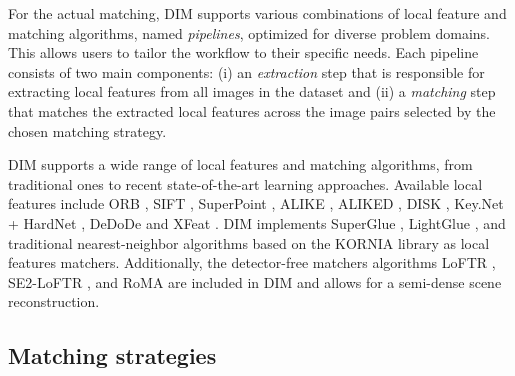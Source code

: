 For the actual matching, DIM supports various combinations of local feature and matching algorithms, named \textit{pipelines}, optimized for diverse problem domains. 
This allows users to tailor the workflow to their specific needs. 
Each pipeline consists of two main components: (i) an \textit{extraction} step that is responsible for extracting local features from all images in the dataset and (ii) a \textit{matching} step that matches the extracted local features across the image pairs selected by the chosen matching strategy.  

DIM supports a wide range of local features and matching algorithms, from traditional ones to recent state-of-the-art learning approaches. 
Available local features include ORB \citep{Rublee2011}, SIFT \citep{Lowe2004}, SuperPoint \citep{DeTone_2018}, ALIKE \citep{zhao2022alike}, ALIKED \citep{zhao2023aliked}, DISK \citep{tyszkiewicz2020disk}, Key.Net \citep{barrosolaguna2019keynet} + HardNet \citep{pultar2020improving}, DeDoDe \citep{edstedt2024dedode} and XFeat \cite{potje2024cvpr}.
DIM implements SuperGlue \citep{sarlin2020superglue}, LightGlue \citep{lindenberger2023lightglue}, and traditional nearest-neighbor algorithms based on the KORNIA library \citep{riba2019kornia} as local features matchers. 
Additionally, the detector-free matchers algorithms LoFTR \citep{sun2021_loftr}, SE2-LoFTR \citep{Bkman2022_se2loftr}, and RoMA \citep{edstedt2023roma} are included in DIM and allows for a semi-dense scene reconstruction.

\subsection{Matching strategies}\label{sec:5:matching_stategies}

